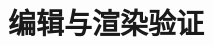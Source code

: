 \documentclass[lang=cn,mode=fancy,color=blue]{elegantbook}
\begin{document}
\chapter{编辑与渲染验证}

\end{document}
